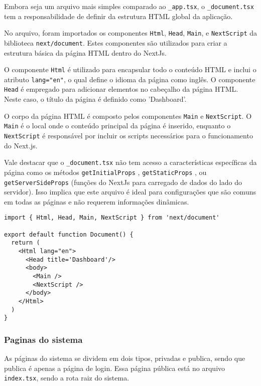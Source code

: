 Embora seja um arquivo mais simples comparado ao \texttt{\_app.tsx}, o \texttt{\_document.tsx} tem a responsabilidade de definir da estrutura HTML global da aplicação.

No arquivo, foram importados os componentes \texttt{Html}, \texttt{Head}, \texttt{Main}, e \texttt{NextScript} da biblioteca \texttt{next/document}. Estes componentes são utilizados para criar a estrutura básica da página HTML dentro do NextJs.

O componente \texttt{Html} é utilizado para encapsular todo o conteúdo HTML e inclui o atributo \texttt{lang="en"}, o qual define o idioma da página como inglês. O componente \texttt{Head} \cite{nextjsHeadComponent} é empregado para adicionar elementos no cabeçalho da página HTML. Neste caso, o título da página é definido como 'Dashboard'.

O corpo da página HTML é composto pelos componentes \texttt{Main} e \texttt{NextScript}. O \texttt{Main} é o local onde o conteúdo principal da página é inserido, enquanto o \texttt{NextScript} é responsável por incluir os scripts necessários para o funcionamento do Next.js.

Vale destacar que o \texttt{\_document.tsx} não tem acesso a características específicas da página como os métodos \texttt{getInitialProps} \cite{nextjsInitialProps}, \texttt{getStaticProps} \cite{nextjsGetStaticProps}, ou \texttt{getServerSideProps} \cite{nextjsGetServerSideProps} (funções do NextJs para carregado de dados do lado do servidor). Isso implica que este arquivo é ideal para configurações que são comuns em todas as páginas e não requerem informações dinâmicas.

\begin{verbatim}
import { Html, Head, Main, NextScript } from 'next/document'

export default function Document() {
  return (
    <Html lang="en">
      <Head title='Dashboard'/>
      <body>
        <Main />
        <NextScript />
      </body>
    </Html>
  )
}
\end{verbatim}

\subsubsection{Paginas do sistema}\label{subsec:}
As páginas do sistema se dividem em dois tipos, privadas e publica, sendo que publica é apenas a página de login. Essa página pública está no arquivo \texttt{index.tsx}, sendo a rota raiz do sistema. 


